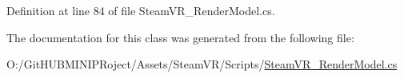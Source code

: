 Definition at line 84 of file Steam\+V\+R\+\_\+\+Render\+Model.\+cs.



The documentation for this class was generated from the following file\+:\begin{DoxyCompactItemize}
\item 
O\+:/\+Git\+H\+U\+B\+M\+I\+N\+I\+P\+Roject/\+Assets/\+Steam\+V\+R/\+Scripts/\mbox{\hyperlink{_steam_v_r___render_model_8cs}{Steam\+V\+R\+\_\+\+Render\+Model.\+cs}}\end{DoxyCompactItemize}

